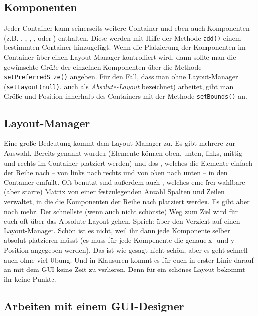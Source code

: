 \subsection{Komponenten}

Jeder Container kann seinerseits weitere Container und eben auch Komponenten
(z.B. , , ,
,  oder ) enthalten.
Diese werden mit Hilfe der Methode \lstinline|add()| einem bestimmten Container
hinzugefügt. Wenn die Platzierung der Komponenten im Container über einen
Layout-Manager kontrolliert wird, dann sollte man die gewünschte Größe der
einzelnen Komponenten über die Methode \lstinline|setPreferredSize()| angeben.
Für den Fall, dass man ohne Layout-Manager (\lstinline|setLayout(null)|, auch
als \emph{Absolute-Layout} bezeichnet) arbeitet, gibt man Größe und Position
innerhalb des Containers mit der Methode \lstinline|setBounds()| an.

\subsection{Layout-Manager}

Eine große Bedeutung kommt dem Layout-Manager zu. Es gibt mehrere zur Auswahl.
Bereits genannt wurden  (Elemente können oben, unten,
links, mittig und rechts im Container platziert werden) und das
, welches die Elemente einfach der Reihe nach – von links
nach rechts und von oben nach unten – in den Container einfüllt. Oft benutzt
sind außerdem auch , welches eine frei-wählbare (aber
starre) Matrix von einer festzulegenden Anzahl Spalten und Zeilen verwaltet, in
die die Komponenten der Reihe nach platziert werden. Es gibt aber noch mehr.
Der schnellste (wenn auch nicht schönste) Weg zum Ziel wird für euch oft über
das Absolute-Layout gehen. Sprich: über den Verzicht auf einen Layout-Manager.
Schön ist es nicht, weil ihr dann jede Komponente selber absolut platzieren
müsst (es muss für jede Komponente die genaue x- und y-Position angegeben
werden). Das ist wie gesagt nicht schön, aber es geht schnell auch ohne
viel Übung. Und in Klausuren kommt es für euch in erster Linie darauf an mit
dem GUI keine Zeit zu verlieren. Denn für ein schönes Layout bekommt ihr keine
Punkte.

\subsection{Arbeiten mit einem GUI-Designer}

